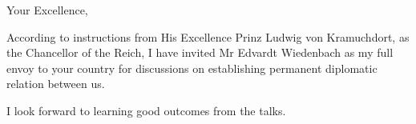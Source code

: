 

\renewcommand{\letterheadgoventity}{Nummer 8}




\noindent
Your Excellence,

According to instructions from His Excellence Prinz Ludwig von Kramuchdort,
as the Chancellor of the Reich,
I have invited Mr Edvardt Wiedenbach as my full envoy to your country
for discussions on establishing permanent diplomatic relation between us.

I look forward to learning good outcomes from the talks.


